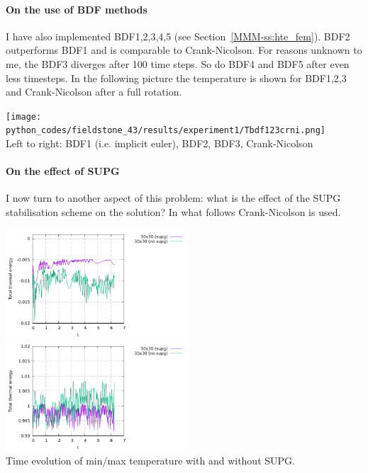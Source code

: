\paragraph{On the use of BDF methods} I have also implemented 
BDF1,2,3,4,5  (see Section~\ref{MMM-ss:hte_fem}). 
BDF2 outperforms BDF1 and is comparable to Crank-Nicolson. 
For reasons unknown to me, the BDF3 diverges after 100 time steps. So do 
BDF4 and BDF5 after even less timesteps. In the following picture the temperature is shown for 
BDF1,2,3 and Crank-Nicolson after a full rotation.

\begin{center}
\texttt{[image: python\_codes/fieldstone\_43/results/experiment1/Tbdf123crni.png]}\\
{\captionfont Left to right: BDF1 (i.e. implicit euler), BDF2, BDF3, Crank-Nicolson}
\end{center}

\paragraph{On the effect of SUPG} 
I now turn to another aspect of this problem: what is the effect of the SUPG stabilisation 
scheme on the solution? In what follows Crank-Nicolson is used. 

\begin{center}
\includegraphics[width=6.8cm]{python_codes/fieldstone_43/results/experiment1/Tmin_supg}
\includegraphics[width=6.8cm]{python_codes/fieldstone_43/results/experiment1/Tmax_supg}\\
{\captionfont Time evolution of min/max temperature with and without SUPG.} 
\end{center}

